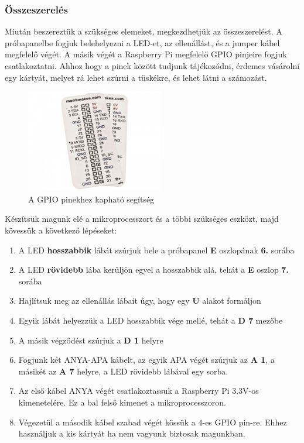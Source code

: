 \documentclass[a4paper,12pt]{report}
\begin{document}
\subsubsection{Összeszerelés}
    Miután beszereztük a szükséges elemeket, megkezdhetjük az összeszerelést. A próbapanelbe fogjuk belehelyezni a LED-et,
    az ellenállást, és a jumper kábel megfelelő végét. A másik végét a Raspberry Pi megfelelő GPIO pinjeire fogjuk csatlakoztatni.
    Ahhoz hogy a pinek között tudjunk tájékozódni, érdemes vásárolni egy kártyát, melyet rá lehet szúrni a tüskékre, és lehet látni
    a számozást.

\begin{figure}[h!]
    \hspace{5cm}
    \includegraphics[width=6cm]{images/gpiohelper.jpg}
    \caption{A GPIO pinekhez kapható segítség}
    \label{fig: Pin segítség}
\end{figure}

    Készítsük magunk elé a mikroprocesszort és a többi szükséges eszközt, majd kövessük a következő lépéseket:

\begin{enumerate}
    \item A LED \textbf{hosszabbik} lábát szúrjuk bele a próbapanel \textbf{E} oszlopának \textbf{6.} sorába
    \item A LED \textbf{rövidebb} lába kerüljön egyel a hosszabbik alá, tehát a \textbf{E} oszlop \textbf{7.} sorába
    \item Hajlítsuk meg az ellenállás lábait úgy, hogy egy \textbf{U} alakot formáljon
    \item Egyik lábát helyezzük a LED hosszabbik vége mellé, tehát a \textbf{D 7} mezőbe
    \item A másik végződést szúrjuk a \textbf{D 1} helyre
    \item Fogjunk két ANYA-APA kábelt, az egyik APA végét szúrjuk az \textbf{A 1}, a másikét az \textbf{A 7} helyre, a LED
    rövidebb lábával egy sorba.
    \item Az első kábel ANYA végét csatlakoztassuk a Raspberry Pi 3.3V-os kimenetelére. Ez a bal felső kimenet a mikroprocesszoron.
    \item Végezetül a második kábel szabad végét kössük a 4-es GPIO pin-re. Ehhez használjuk a kis kártyát ha nem vagyunk biztosak
    magunkban.
\end{enumerate}
\end{document}
